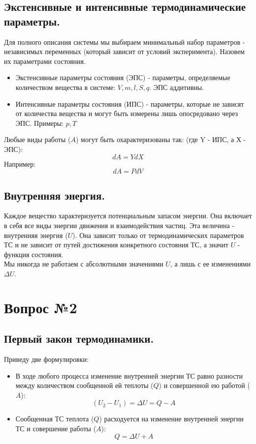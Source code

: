 \documentclass[14pt,a4paper]{scrartcl}
\begin{document}
		\subsection*{Экстенсивные и интенсивные термодинамические параметры.} 
		Для полного описания системы мы выбираем минимальный набор параметров - независимых переменных (который зависит от условий эксперимента). Назовем их параметрами состояния.
		\begin{itemize}
			\item Экстенсивные параметры состояния (ЭПС) - параметры, определяемые количеством вещества в системе: $ V, m, l, S, q  $. ЭПС аддитивны.
			\item Интенсивные параметры состояния (ИПС) - параметры, которые не зависят от количества вещества и могут быть измерены лишь опосредовано через ЭПС. Примеры: $p, T $
		\end{itemize}
		Любые виды работы ($A$) могут быть охарактеризованы так: (где Y - ИПС, а Х - ЭПС):
		$$ dA = Y dX  $$ 
		Например:
		$$ dA = P dV  $$
		\subsection*{Внутренняя энергия.} 
		Каждое вещество характеризуется потенциальным запасом энергии. Она включает в себя все виды энергии движения и взаимодействия частиц. Эта величина - внутренняя энергия ($U$). Она зависит только от термодинамических параметров ТС и не зависит от путей достижения конкретного состояния ТС, а значит $U$ - функция состояния. \\
		Мы никогда не работаем с абсолютными значениями $U$, а лишь с ее изменениями $\Delta{U}$.
		

\section*{Вопрос №2}
		\subsection*{Первый закон термодинамики.} 
		Приведу две формулировки:
		\begin{itemize}
			\item В ходе любого процесса изменение внутренней энергии ТС равно разности между количеством сообщенной ей теплоты ($Q$) и совершенной ею работой ($A$):
			$$ (U_2 - U_1) = \Delta{U} = Q - A $$
			\item Сообщенная ТС теплота ($Q$) расходуется на изменение внутренней энергии ТС и совершение работы ($A$):
			$$ Q = \Delta{U} + A $$
		\end{itemize}
\end{document}
